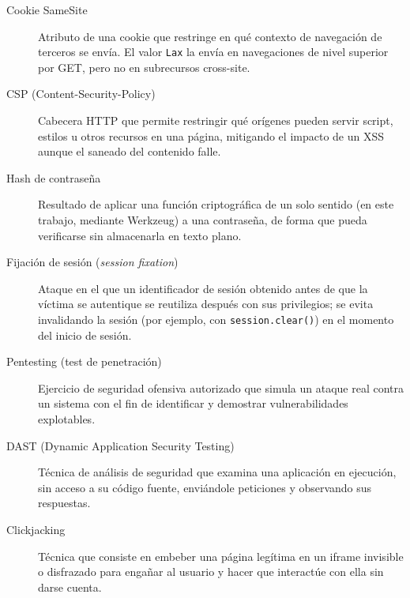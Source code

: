 \begin{description}
\item[Cookie SameSite] Atributo de una cookie que restringe en qué contexto
  de navegación de terceros se envía. El valor \texttt{Lax} la envía en
  navegaciones de nivel superior por GET, pero no en subrecursos
  cross-site.

\item[CSP (Content-Security-Policy)] Cabecera HTTP que permite restringir
  qué orígenes pueden servir script, estilos u otros recursos en una
  página, mitigando el impacto de un XSS aunque el saneado del contenido
  falle.

\item[Hash de contraseña] Resultado de aplicar una función criptográfica
  de un solo sentido (en este trabajo, mediante Werkzeug) a una contraseña,
  de forma que pueda verificarse sin almacenarla en texto plano.

\item[Fijación de sesión (\emph{session fixation})] Ataque en el que un
  identificador de sesión obtenido antes de que la víctima se autentique se
  reutiliza después con sus privilegios; se evita invalidando la sesión
  (por ejemplo, con \texttt{session.clear()}) en el momento del inicio de
  sesión.

\item[Pentesting (test de penetración)] Ejercicio de seguridad ofensiva
  autorizado que simula un ataque real contra un sistema con el fin de
  identificar y demostrar vulnerabilidades explotables.

\item[DAST (Dynamic Application Security Testing)] Técnica de análisis de
  seguridad que examina una aplicación en ejecución, sin acceso a su código
  fuente, enviándole peticiones y observando sus respuestas.

\item[Clickjacking] Técnica que consiste en embeber una página legítima en
  un iframe invisible o disfrazado para engañar al usuario y hacer que
  interactúe con ella sin darse cuenta.
\end{description}
